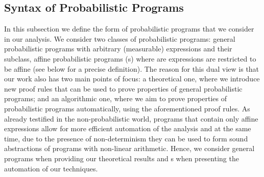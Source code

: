 

\vspace{-1em}
\subsection{Syntax of Probabilistic Programs}\label{subsec:syntax}
\vspace{-0.5em}

In this subsection we define the form of probabilistic programs that we 
consider in our analysis. We consider two classes of probabilistic programs: 
general probabilistic programs with arbitrary (measurable) expressions and 
their subclass, affine probabilistic programs (\APP s) where are expressions 
are restricted to be affine (see below for a precise definition). The reason 
for this dual view is that our work also has two main points of focus: a 
theoretical one, where we introduce new proof rules that can be used to prove 
properties of general probabilistic programs; and an algorithmic one, where we 
aim to prove properties of probabilistic programs automatically, using the 
aforementioned proof rules. As already testified in the non-probabilistic 
world, programs that contain only affine expressions allow for more efficient 
automation of the analysis and at the same time, due to the presence of 
non-determinism they can be used to form sound abstractions of programs with 
non-linear arithmetic. Hence, we consider general programs when providing our 
theoretical results and \APP s when presenting the automation of our techniques.

